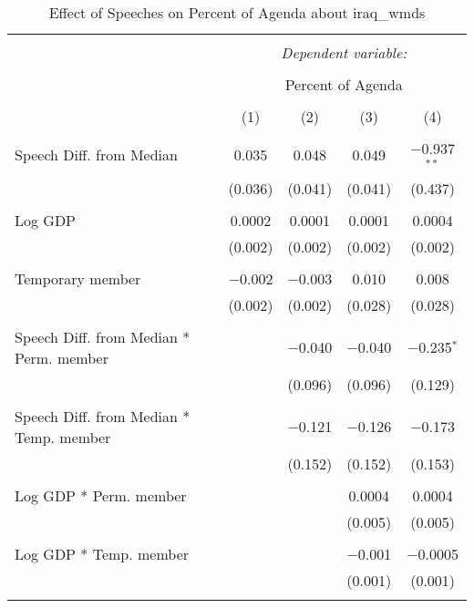 
\begin{table}[!htbp] \centering 
  \caption{Effect of Speeches on Percent of Agenda about iraq_wmds} 
  \label{} 
\begin{tabular}{@{\extracolsep{5pt}}lcccc} 
\\[-1.8ex]\hline 
\hline \\[-1.8ex] 
 & \multicolumn{4}{c}{\textit{Dependent variable:}} \\ 
\cline{2-5} 
\\[-1.8ex] & \multicolumn{4}{c}{Percent of Agenda} \\ 
\\[-1.8ex] & (1) & (2) & (3) & (4)\\ 
\hline \\[-1.8ex] 
 Speech Diff. from Median & 0.035 & 0.048 & 0.049 & $-$0.937$^{**}$ \\ 
  & (0.036) & (0.041) & (0.041) & (0.437) \\ 
  & & & & \\ 
 Log GDP & 0.0002 & 0.0001 & 0.0001 & 0.0004 \\ 
  & (0.002) & (0.002) & (0.002) & (0.002) \\ 
  & & & & \\ 
 Temporary member & $-$0.002 & $-$0.003 & 0.010 & 0.008 \\ 
  & (0.002) & (0.002) & (0.028) & (0.028) \\ 
  & & & & \\ 
 Speech Diff. from Median * Perm. member &  & $-$0.040 & $-$0.040 & $-$0.235$^{*}$ \\ 
  &  & (0.096) & (0.096) & (0.129) \\ 
  & & & & \\ 
 Speech Diff. from Median * Temp. member &  & $-$0.121 & $-$0.126 & $-$0.173 \\ 
  &  & (0.152) & (0.152) & (0.153) \\ 
  & & & & \\ 
 Log GDP * Perm. member &  &  & 0.0004 & 0.0004 \\ 
  &  &  & (0.005) & (0.005) \\ 
  & & & & \\ 
 Log GDP * Temp. member &  &  & $-$0.001 & $-$0.0005 \\ 
  &  &  & (0.001) & (0.001) \\ 
  & & & & \\ 

\end{tabular}
\end{table}

